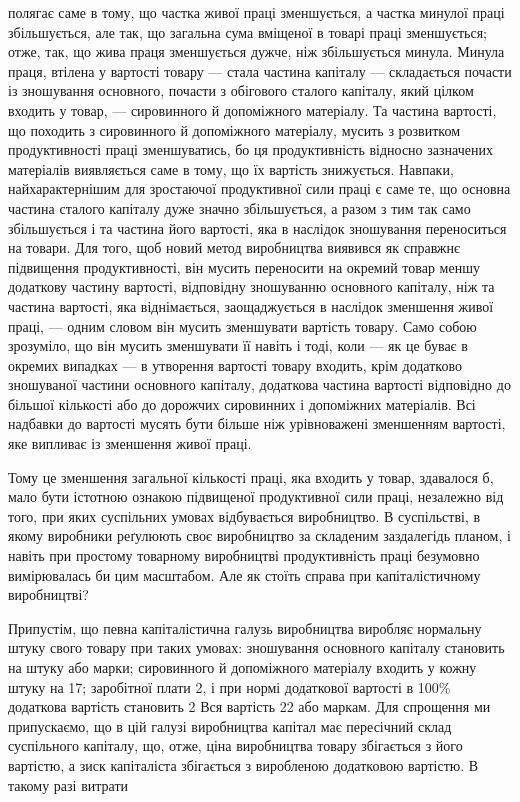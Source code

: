 \parcont{}  %
полягає саме в тому, що частка живої праці зменшується,
а частка минулої праці збільшується, але так, що загальна сума
вміщеної в товарі праці зменшується; отже, так, що жива праця
зменшується дужче, ніж збільшується минула. Минула праця,
втілена у вартості товару — стала частина капіталу — складається
почасти із зношування основного, почасти з обігового
сталого капіталу, який цілком входить у товар, — сировинного
й допоміжного матеріалу. Та частина вартості, що походить
з сировинного й допоміжного матеріалу, мусить з розвитком
продуктивності праці зменшуватись, бо ця продуктивність відносно
зазначених матеріалів виявляється саме в тому, що їх вартість
знижується. Навпаки, найхарактернішим для зростаючої
продуктивної сили праці є саме те, що основна частина сталого
капіталу дуже значно збільшується, а разом з тим так само
збільшується і та частина його вартості, яка в наслідок зношування
переноситься на товари. Для того, щоб новий метод
виробництва виявився як справжнє підвищення продуктивності,
він мусить переносити на окремий товар меншу додаткову частину
вартості, відповідну зношуванню основного капіталу,
ніж та частина вартості, яка віднімається, заощаджується в наслідок
зменшення живої праці, — одним словом він мусить зменшувати
вартість товару. Само собою зрозуміло, що він мусить
зменшувати її навіть і тоді, коли — як це буває в окремих випадках
— в утворення вартості товару входить, крім додатково зношуваної
частини основного капіталу, додаткова частина вартості
відповідно до більшої кількості або до дорожчих сировинних і
допоміжних матеріалів. Всі надбавки до вартості мусять бути
більше ніж урівноважені зменшенням вартості, яке випливає із
зменшення живої праці.

Тому це зменшення загальної кількості праці, яка входить
у товар, здавалося б, мало бути істотною ознакою підвищеної
продуктивної сили праці, незалежно від того, при яких суспільних
умовах відбувається виробництво. В суспільстві, в якому
виробники реґулюють своє виробництво за складеним заздалегідь
планом, і навіть при простому товарному виробництві продуктивність
праці безумовно вимірювалась би цим масштабом.
Але як стоїть справа при капіталістичному виробництві?

Припустім, що певна капіталістична галузь виробництва
виробляє нормальну штуку свого товару при таких умовах: зношування
основного капіталу становить на штуку  або
марки; сировинного й допоміжного матеріалу входить у кожну
штуку на 17; заробітної плати 2, і при нормі
додаткової вартості в 100\% додаткова вартість становить 2
Вся вартість \deq{} 22 або маркам. Для спрощення
ми припускаємо, що в цій галузі виробництва капітал має пересічний
склад суспільного капіталу, що, отже, ціна виробництва
товару збігається з його вартістю, а зиск капіталіста збігається
з виробленою додатковою вартістю. В такому разі витрати
\parbreak{}  %
